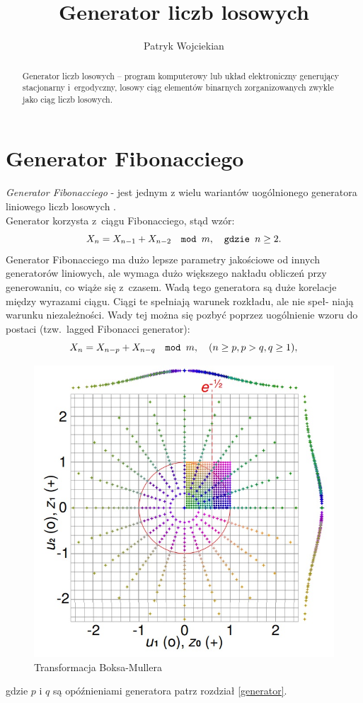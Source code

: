 \documentclass[12pt,a4paper]{article}
\title{Generator liczb losowych}
\author{Patryk Wojciekian}
\begin{document}
\maketitle
\begin{abstract}
Generator liczb losowych -- program komputerowy lub układ elektroniczny generujący stacjonarny i~ergodyczny, losowy ciąg elementów binarnych zorganizowanych zwykle jako ciąg liczb losowych.
\end{abstract}
\tableofcontents
\section{Generator Fibonacciego}
\textit{Generator Fibonacciego} - jest jednym z wielu wariantów uogólnionego generatora liniowego liczb losowych \cite{klucz1}.\\
Generator korzysta z~ciągu Fibonacciego, stąd wzór:
$$
X_n=X_{n-1}+X_{n-2} \quad \verb"mod " m, \quad \verb"gdzie " n\geq 2.\\
$$
Generator Fibonacciego ma dużo lepsze parametry jakościowe od innych
generatorów liniowych, ale wymaga dużo większego nakładu obliczeń przy
generowaniu, co wiąże się z~czasem. Wadą tego generatora są duże korelacje
między wyrazami ciągu. Ciągi te spełniają warunek rozkładu, ale nie speł-
niają warunku niezależności. Wady tej można się pozbyć poprzez uogólnienie
wzoru do postaci (tzw.~lagged Fibonacci generator):
$$
X_n=X_{n-p}+X_{n-q} \quad \verb"mod " m, \quad (n\geq p, p>q,q\geq 1),
$$

\begin{figure}[h!]
\centering
\includegraphics[scale=0.5]{obrazek}
\caption{Transformacja Boksa-Mullera}
\label{obraz1}
\end{figure}
gdzie $p$ i $q$ są opóźnieniami generatora patrz rozdział \ref{generator}.
\end{document}
